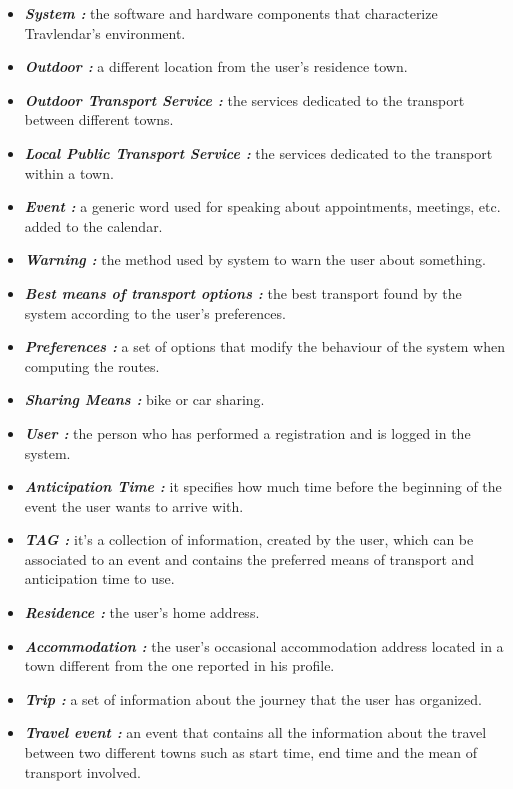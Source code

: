 \begin{itemize}
	\setlength{\leftskip}{0.5cm}
	\item \emph{\textbf{System : }}the software and hardware components that characterize Travlendar’s environment.
	\item \emph{\textbf{Outdoor : }}a different location from the user’s residence town.
	\item \emph{\textbf{Outdoor Transport Service : }}the services dedicated to the transport between different towns.
	\item \emph{\textbf{Local Public Transport Service : }}the services dedicated to the transport within a town.
	\item \emph{\textbf{Event : }}a generic word used for speaking about appointments, meetings, etc. added to the calendar.
	\item \emph{\textbf{Warning : }}the method used by system to warn the user about something.
	\item \emph{\textbf{Best means of transport options : }}the best transport found by the system according to the user’s preferences.
	\item \emph{\textbf{Preferences : }}a set of options that modify the behaviour of the system when computing the routes.
	\item \emph{\textbf{Sharing Means : }}bike or car sharing.
	\item \emph{\textbf{User : }}the person who has performed a registration and is logged in the system.
	\item \emph{\textbf{Anticipation Time : }}it specifies how much time before the beginning of the event the user wants to arrive with.
	\item \emph{\textbf{TAG : }}it’s a collection of information, created by the user, which can be associated to an event and contains the preferred means of transport and anticipation time to use.
	\item \emph{\textbf{Residence : }}the user’s home address.
	\item \emph{\textbf{Accommodation : }}the user’s occasional accommodation address located in a town different from the one reported in his profile.
	\item \emph{\textbf{Trip : }}a set of information about the journey that the user has organized.
	\item \emph{\textbf{Travel event : }}an event that contains all the information about the travel between two different towns such as start time, end time and the mean of transport involved.
\end{itemize}
